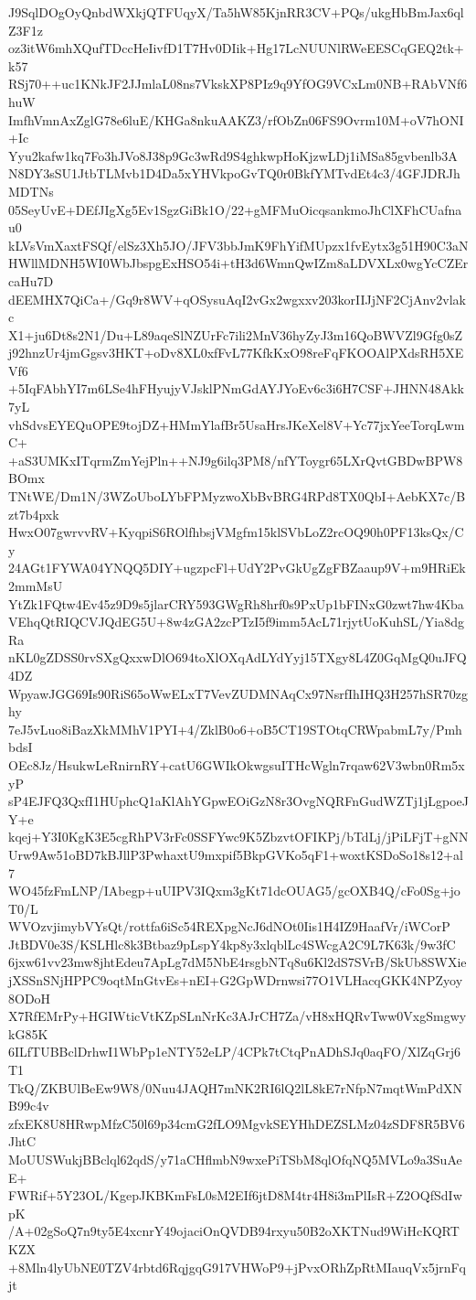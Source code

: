 J9SqlDOgOyQnbdWXkjQTFUqyX/Ta5hW85KjnRR3CV+PQs/ukgHbBmJax6qlZ3F1z
oz3itW6mhXQufTDccHeIivfD1T7Hv0DIik+Hg17LcNUUNlRWeEESCqGEQ2tk+k57
RSj70++uc1KNkJF2JJmlaL08ns7VkskXP8PIz9q9YfOG9VCxLm0NB+RAbVNf6huW
ImfhVmnAxZglG78e6luE/KHGa8nkuAAKZ3/rfObZn06FS9Ovrm10M+oV7hONI+Ic
Yyu2kafw1kq7Fo3hJVo8J38p9Gc3wRd9S4ghkwpHoKjzwLDj1iMSa85gvbenlb3A
N8DY3sSU1JtbTLMvb1D4Da5xYHVkpoGvTQ0r0BkfYMTvdEt4c3/4GFJDRJhMDTNs
05SeyUvE+DEfJIgXg5Ev1SgzGiBk1O/22+gMFMuOicqsankmoJhClXFhCUafnau0
kLVsVmXaxtFSQf/elSz3Xh5JO/JFV3bbJmK9FhYifMUpzx1fvEytx3g51H90C3aN
HWllMDNH5WI0WbJbspgExHSO54i+tH3d6WmnQwIZm8aLDVXLx0wgYcCZErcaHu7D
dEEMHX7QiCa+/Gq9r8WV+qOSysuAqI2vGx2wgxxv203korIIJjNF2CjAnv2vlakc
X1+ju6Dt8s2N1/Du+L89aqeSlNZUrFc7ili2MnV36hyZyJ3m16QoBWVZl9Gfg0sZ
j92hnzUr4jmGgsv3HKT+oDv8XL0xfFvL77KfkKxO98reFqFKOOAlPXdsRH5XEVf6
+5IqFAbhYI7m6LSe4hFHyujyVJsklPNmGdAYJYoEv6c3i6H7CSF+JHNN48Akk7yL
vhSdvsEYEQuOPE9tojDZ+HMmYlafBr5UsaHrsJKeXel8V+Yc77jxYeeTorqLwmC+
+aS3UMKxITqrmZmYejPln++NJ9g6ilq3PM8/nfYToygr65LXrQvtGBDwBPW8BOmx
TNtWE/Dm1N/3WZoUboLYbFPMyzwoXbBvBRG4RPd8TX0QbI+AebKX7c/Bzt7b4pxk
HwxO07gwrvvRV+KyqpiS6ROlfhbsjVMgfm15klSVbLoZ2rcOQ90h0PF13ksQx/Cy
24AGt1FYWA04YNQQ5DIY+ugzpcFl+UdY2PvGkUgZgFBZaaup9V+m9HRiEk2mmMsU
YtZk1FQtw4Ev45z9D9s5jlarCRY593GWgRh8hrf0s9PxUp1bFINxG0zwt7hw4Kba
VEhqQtRIQCVJQdEG5U+8w4zGA2zcPTzI5f9imm5AcL71rjytUoKuhSL/Yia8dgRa
nKL0gZDSS0rvSXgQxxwDlO694toXlOXqAdLYdYyj15TXgy8L4Z0GqMgQ0uJFQ4DZ
WpyawJGG69Is90RiS65oWwELxT7VevZUDMNAqCx97NsrfIhIHQ3H257hSR70zghy
7eJ5vLuo8iBazXkMMhV1PYI+4/ZklB0o6+oB5CT19STOtqCRWpabmL7y/PmhbdsI
OEc8Jz/HsukwLeRnirnRY+catU6GWIkOkwgsuITHcWgln7rqaw62V3wbn0Rm5xyP
sP4EJFQ3QxfI1HUphcQ1aKlAhYGpwEOiGzN8r3OvgNQRFnGudWZTj1jLgpoeJY+e
kqej+Y3I0KgK3E5cgRhPV3rFc0SSFYwc9K5ZbzvtOFIKPj/bTdLj/jPiLFjT+gNN
Urw9Aw51oBD7kBJllP3PwhaxtU9mxpif5BkpGVKo5qF1+woxtKSDoSo18s12+al7
WO45fzFmLNP/IAbegp+uUIPV3IQxm3gKt71dcOUAG5/gcOXB4Q/cFo0Sg+joT0/L
WVOzvjimybVYsQt/rottfa6iSc54REXpgNcJ6dNOt0Iis1H4IZ9HaafVr/iWCorP
JtBDV0e3S/KSLHlc8k3Btbaz9pLspY4kp8y3xlqblLc4SWcgA2C9L7K63k/9w3fC
6jxw61vv23mw8jhtEdeu7ApLg7dM5NbE4rsgbNTq8u6Kl2dS7SVrB/SkUb8SWXie
jXSSnSNjHPPC9oqtMnGtvEs+nEI+G2GpWDrnwsi77O1VLHacqGKK4NPZyoy8ODoH
X7RfEMrPy+HGIWticVtKZpSLnNrKc3AJrCH7Za/vH8xHQRvTww0VxgSmgwykG85K
6ILfTUBBclDrhwI1WbPp1eNTY52eLP/4CPk7tCtqPnADhSJq0aqFO/XlZqGrj6T1
TkQ/ZKBUlBeEw9W8/0Nuu4JAQH7mNK2RI6lQ2lL8kE7rNfpN7mqtWmPdXNB99c4v
zfxEK8U8HRwpMfzC50l69p34cmG2fLO9MgvkSEYHhDEZSLMz04zSDF8R5BV6JhtC
MoUUSWukjBBclql62qdS/y71aCHflmbN9wxePiTSbM8qlOfqNQ5MVLo9a3SuAeE+
FWRif+5Y23OL/KgepJKBKmFsL0sM2EIf6jtD8M4tr4H8i3mPlIsR+Z2OQfSdIwpK
/A+02gSoQ7n9ty5E4xcnrY49ojaciOnQVDB94rxyu50B2oXKTNud9WiHcKQRTKZX
+8Mln4lyUbNE0TZV4rbtd6RqjgqG917VHWoP9+jPvxORhZpRtMIauqVx5jrnFqjt
